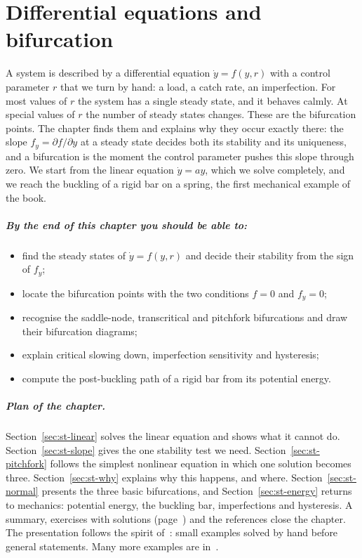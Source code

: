 \chapter{Differential equations and bifurcation}\label{ch:st}

A system is described by a differential equation $\dot y = f(y,r)$ with a
control parameter $r$ that we turn by hand: a load, a catch rate, an
imperfection. For most values of $r$ the system has a single steady state,
and it behaves calmly. At special values of $r$ the number of steady states
changes. These are the bifurcation points. The chapter finds them and explains
why they occur exactly there: the slope $f_y = \partial f/\partial y$ at a steady
state decides both its stability and its uniqueness, and a bifurcation is the
moment the control parameter pushes this slope through zero. We start from the
linear equation $\dot y = ay$, which we solve completely, and we reach the
buckling of a rigid bar on a spring, the first mechanical example of the book.

\paragraph{By the end of this chapter you should be able to:}
\begin{itemize}
  \item find the steady states of $\dot y = f(y,r)$ and decide their stability
        from the sign of $f_y$;
  \item locate the bifurcation points with the two conditions $f = 0$ and $f_y = 0$;
  \item recognise the saddle-node, transcritical and pitchfork bifurcations
        and draw their bifurcation diagrams;
  \item explain critical slowing down, imperfection sensitivity and hysteresis;
  \item compute the post-buckling path of a rigid bar from its potential energy.
\end{itemize}

\paragraph{Plan of the chapter.}
Section~\ref{sec:st-linear} solves the linear equation and shows what it cannot
do. Section~\ref{sec:st-slope} gives the one stability test we need.
Section~\ref{sec:st-pitchfork} follows the simplest nonlinear equation in which
one solution becomes three. Section~\ref{sec:st-why} explains why this happens,
and where. Section~\ref{sec:st-normal} presents the three basic bifurcations,
and Section~\ref{sec:st-energy} returns to mechanics: potential energy, the
buckling bar, imperfections and hysteresis. A summary, exercises with solutions
(page~\pageref{sec:st-exo}) and the references close the chapter. The presentation follows the spirit
of~\cite{st-strang2014}: small examples solved by hand before general statements.
Many more examples are in~\cite{st-strogatz2015}.

